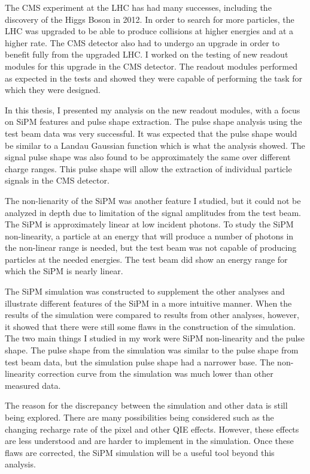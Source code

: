 The CMS experiment at the LHC has had many successes, including the discovery of the Higgs Boson in 2012. In order to search for more particles, the LHC was upgraded to be able to produce collisions at higher energies and at a higher rate. The CMS detector also had to undergo an upgrade in order to benefit fully from the upgraded LHC. I worked on the testing of new readout modules for this upgrade in the CMS detector. The readout modules performed as expected in the tests and showed they were capable of performing the task for which they were designed. 

In this thesis, I presented my analysis on the new readout modules, with a focus on SiPM features and pulse shape extraction. The pulse shape analysis using the test beam data was very successful. It was expected that the pulse shape would be similar to a Landau Gaussian function which is what the analysis showed. The signal pulse shape was also found to be approximately the same over different charge ranges. This pulse shape will allow the extraction of individual particle signals in the CMS detector. 

The non-lienarity of the SiPM was another feature I studied, but it could not be analyzed in depth due to limitation of the signal amplitudes from the test beam. The SiPM is approximately linear at low incident photons. To study the SiPM non-linearity, a particle at an energy that will produce a number of photons in the non-linear range is needed, but the test beam was not capable of producing particles at the needed energies. The test beam did show an energy range for which the SiPM is nearly linear.

The SiPM simulation was constructed to supplement the other analyses and illustrate different features of the SiPM in a more intuitive manner. When the results of the simulation were compared to results from other analyses, however, it showed that there were still some flaws in the construction of the simulation. The two main things I studied in my work were SiPM non-linearity and the pulse shape. The pulse shape from the simulation was similar to the pulse shape from test beam data, but the simulation pulse shape had a narrower base. The non-linearity correction curve from the simulation was much lower than other measured data.

The reason for the discrepancy between the simulation and other data is still being explored. There are many possibilities being considered such as the changing recharge rate of the pixel and other QIE effects. However, these effects are less understood and are harder to implement in the simulation. Once these flaws are corrected, the SiPM simulation will be a useful tool beyond this analysis. 

